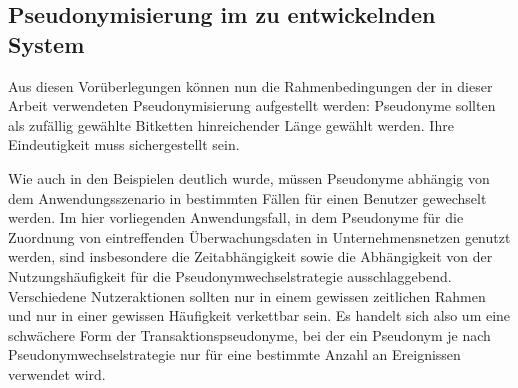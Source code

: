 \subsection{Pseudonymisierung im zu entwickelnden System}


Aus diesen Vorüberlegungen können nun die Rahmenbedingungen der in dieser Arbeit verwendeten Pseudonymisierung aufgestellt werden:
Pseudonyme sollten als zufällig gewählte Bitketten hinreichender Länge gewählt werden. Ihre Eindeutigkeit muss sichergestellt sein.

Wie auch in den Beispielen deutlich wurde, müssen Pseudonyme abhängig von dem Anwendungsszenario in bestimmten Fällen für einen Benutzer gewechselt werden. Im hier vorliegenden Anwendungsfall, in dem Pseudonyme für die Zuordnung von eintreffenden Überwachungsdaten in Unternehmensnetzen genutzt werden, sind insbesondere die Zeitabhängigkeit sowie die Abhängigkeit von der Nutzungshäufigkeit für die Pseudonymwechselstrategie ausschlaggebend.\\
Verschiedene Nutzeraktionen sollten nur in einem gewissen zeitlichen Rahmen und nur in einer gewissen Häufigkeit verkettbar sein. Es handelt sich also um eine schwächere Form der Transaktionspseudonyme, bei der ein Pseudonym je nach Pseudonymwechselstrategie nur für eine bestimmte Anzahl an Ereignissen verwendet wird.

